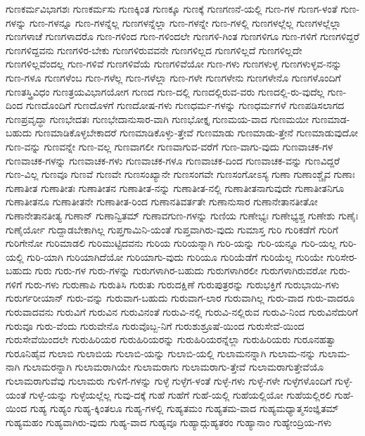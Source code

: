 {ಗುಣಕರ್ಮವಿಭಾಗಶಃ
ಗುಣಕರ್ಮಸು
ಗುಣಕ್ಕಿಂತ
ಗುಣಕ್ಕೂ
ಗುಣಕ್ಕೆ
ಗುಣಗಣನೆ-ಯಲ್ಲಿ
ಗುಣ-ಗಳ
ಗುಣಗ-ಳಂತೆ
ಗುಣ-ಗಳನ್ನು
ಗುಣ-ಗಳನ್ನೂ
ಗುಣ-ಗಳನ್ನೆಲ್ಲ
ಗುಣಗಳನ್ನೆಲ್ಲಾ
ಗುಣ-ಗಳನ್ನೇ
ಗುಣ-ಗಳಲ್ಲಿ
ಗುಣಗಳಲ್ಲೆಲ್ಲ
ಗುಣಗಳಲ್ಲೆಲ್ಲಾ
ಗುಣಗಳಾಚೆ
ಗುಣಗಳಾದರೊ
ಗುಣ-ಗಳಿಂದ
ಗುಣ-ಗಳಿಂದಲೇ
ಗುಣಗಳಿ-ಗಿಂತ
ಗುಣಗಳಿಗೂ
ಗುಣ-ಗಳಿಗೆ
ಗುಣಗಳಿದ್ದರೆ
ಗುಣಗಳಿದ್ದವನು
ಗುಣಗಳಿರ-ಬೇಕು
ಗುಣಗಳಿರುವವನೇ
ಗುಣಗಳಿಲ್ಲದ
ಗುಣಗಳಿಲ್ಲದೆ
ಗುಣಗಳಿಲ್ಲದೇ
ಗುಣಗಳಿಲ್ಲವೆಂದಲ್ಲ
ಗುಣ-ಗಳಿವೆ
ಗುಣಗಳಿವೆಯೆ
ಗುಣಗಳಿವೆಯೋ
ಗುಣ-ಗಳು
ಗುಣಗಳುಳ್ಳ
ಗುಣಗಳುಳ್ಳವ-ನನ್ನು
ಗುಣ-ಗಳೂ
ಗುಣಗಳೆಂಬ
ಗುಣ-ಗಳೆಲ್ಲ
ಗುಣ-ಗಳೆಲ್ಲಾ
ಗುಣ-ಗಳೇ
ಗುಣಗಳೇನು
ಗುಣಗಳೇನೊ
ಗುಣಗಳೊಂದಿಗೆ
ಗುಣತಸ್ತ್ರಿವಿಧಂ
ಗುಣತ್ರಯವಿಭಾಗಯೋಗ
ಗುಣದ
ಗುಣ-ದಲ್ಲಿ
ಗುಣದಲ್ಲಿರುವ-ವರು
ಗುಣದಲ್ಲಿ-ರು-ವುದೆಲ್ಲ
ಗುಣ-ದಿಂದ
ಗುಣದೊಂದಿಗೆ
ಗುಣದೊಳಗೆ
ಗುಣದೋಷ-ಗಳು
ಗುಣಧರ್ಮ-ಗಳನ್ನು
ಗುಣಧರ್ಮಗಳೆ
ಗುಣಪಡಿಸಲಾಗದ
ಗುಣಪ್ರವೃದ್ಧಾ
ಗುಣಭೇದತಃ
ಗುಣಭೇದಾನುಸಾರ-ವಾಗಿ
ಗುಣಭೋಕ್ತೃ
ಗುಣಮಯ-ವಾದ
ಗುಣಮಯೀ
ಗುಣಮಾಡ-ಬಹುದು
ಗುಣಮಾಡಿಕೊಳ್ಳಬೇಕಾದರೆ
ಗುಣಮಾಡಿಕೊಳ್ಳು-ತ್ತೇವೆ
ಗುಣಮಾಡು
ಗುಣಮಾಡು-ತ್ತೇನೆ
ಗುಣಮಾಡುವುದೋ
ಗುಣ-ವನ್ನು
ಗುಣವನ್ನೇ
ಗುಣ-ವಲ್ಲ
ಗುಣವಾಗಲೀ
ಗುಣವಾಗುವ-ವರೆಗೆ
ಗುಣ-ವಾಗು-ವುದು
ಗುಣವಾಚಕ-ಗಳ
ಗುಣವಾಚಕ-ಗಳನ್ನು
ಗುಣವಾಚಕ-ಗಳು
ಗುಣವಾಚಕ-ಗಳೂ
ಗುಣವಾಚಕ-ದಿಂದ
ಗುಣವಾಚಕ-ವನ್ನು
ಗುಣವಿದ್ದರೆ
ಗುಣ-ವಿಲ್ಲ
ಗುಣವೂ
ಗುಣವೆ
ಗುಣವೇ
ಗುಣಸಂಖ್ಯಾನೇ
ಗುಣಸಂಗವೇ
ಗುಣಸಂಗೋಽಸ್ಯ
ಗುಣಾ
ಗುಣಾಂಶ್ಚೈವ
ಗುಣಾಃ
ಗುಣಾತೀತ
ಗುಣಾತೀತಃ
ಗುಣಾತೀತನ
ಗುಣಾತೀತ-ನನ್ನು
ಗುಣಾತೀತ-ನಲ್ಲಿ
ಗುಣಾತೀತನಾಗುವುದೇ
ಗುಣಾತೀತನಿಗೂ
ಗುಣಾತೀತನೂ
ಗುಣಾತೀತನೇ
ಗುಣಾತೀತ-ರಿಂದ
ಗುಣಾನತಿವರ್ತತೇ
ಗುಣಾನುಸಾರ
ಗುಣಾನೇತಾನತೀತೋ
ಗುಣಾನೇತಾನತೀತ್ಯ
ಗುಣಾನ್
ಗುಣಾನ್ವಿತಮ್
ಗುಣಾವಗುಣ-ಗಳನ್ನು
ಗುಣಿಯ
ಗುಣೇಭ್ಯಃ
ಗುಣೇಭ್ಯಶ್ಚ
ಗುಣೇಶು
ಗುಣೈಃ
ಗುಣೈರ್ಯೋ
ಗುದ್ದಾಡಬೇಕಾಗಿಲ್ಲ
ಗುಪ್ತಗಾಮಿನಿ-ಯಂತೆ
ಗುಪ್ತವಾಗಿರು-ವುದು
ಗುಮಾಸ್ತ
ಗುರಿ
ಗುರಿಕಡೆಗೆ
ಗುರಿಗೆ
ಗುರಿಗೇನೋ
ಗುರಿಮಾಡಲಿ
ಗುರಿಮುಟ್ಟಿದವನು
ಗುರಿಯ
ಗುರಿಯನ್ನಾಗಿ
ಗುರಿ-ಯನ್ನು
ಗುರಿ-ಯನ್ನೂ
ಗುರಿ-ಯಲ್ಲ
ಗುರಿ-ಯಲ್ಲಿ
ಗುರಿ-ಯಾಗಿ
ಗುರಿಯಾಗಿದೆಯೋ
ಗುರಿಯಾಗು-ವುದು
ಗುರಿಯೂ
ಗುರಿಯೆಡೆಗೆ
ಗುರಿಯೆಲ್ಲ
ಗುರಿಯೇ
ಗುರಿಸೇರ-ಬಹುದು
ಗುರು
ಗುರು-ಗಳ
ಗುರು-ಗಳನ್ನು
ಗುರುಗಳಾಗಿರ-ಬಹುದು
ಗುರುಗಳಾಗಿರಲೀ
ಗುರುಗಳಾಗಿರುವರೋ
ಗುರು-ಗಳಿಗೆ
ಗುರು-ಗಳು
ಗುರುಣಾಪಿ
ಗುರುತಿಸಿ
ಗುರುತು
ಗುರುದಕ್ಷಿಣೆ
ಗುರುಪುತ್ರರನ್ನು
ಗುರುಭಕ್ತಿಗೆ
ಗುರುಭಾಯಿ-ಗಳು
ಗುರುರ್ಗರೀಯಾನ್
ಗುರು-ವನ್ನು
ಗುರುವಾಗ-ಬಹುದು
ಗುರುವಾಗ-ಲಾರ
ಗುರುವಾಗಿಲ್ಲ
ಗುರು-ವಾದ
ಗುರು-ವಾದರೂ
ಗುರುವಾದವನು
ಗುರುವಿಗೆ
ಗುರುವಿನ
ಗುರುವಿನಂತೆ
ಗುರುವಿ-ನಲ್ಲಿ
ಗುರುವಿ-ನಲ್ಲಿರುವ
ಗುರುವಿ-ನಿಂದ
ಗುರುವಿನೆದುರಿಗೆ
ಗುರುವೂ
ಗುರು-ವೆಂದು
ಗುರುವೇನೊ
ಗುರುವೊಬ್ಬ-ನಿಗೆ
ಗುರುಶುಶ್ರೂಷೆ-ಯಿಂದ
ಗುರುಸೇವೆ-ಯಿಂದ
ಗುರುಸೇವೆಯಿಂದಲೇ
ಗುರುಹಿರಿಯರ
ಗುರುಹಿರಿಯರನ್ನು
ಗುರುಹಿರಿಯರನ್ನೆಲ್ಲಾ
ಗುರುಹಿರಿಯರು
ಗುರೂನಹತ್ವಾ
ಗುರೂನಿಹೈವ
ಗುಲಾಬಿ
ಗುಲಾಬಿಯ
ಗುಲಾಬಿ-ಯನ್ನು
ಗುಲಾಬಿ-ಯಲ್ಲಿ
ಗುಲಾಮನನ್ನಾಗಿ
ಗುಲಾಮ-ನನ್ನು
ಗುಲಾಮ-ನಾಗಿ
ಗುಲಾಮರನ್ನಾಗಿ
ಗುಲಾಮರಾಗಿಯೇ
ಗುಲಾಮರಾಗು
ಗುಲಾಮರಾಗು-ತ್ತೇವೆ
ಗುಲಾಮರಾಗುತ್ತೇವೆಯೊ
ಗುಲಾಮರಾಗುವೆವು
ಗುಲಾಮರು
ಗುಳಿಗೆ-ಗಳನ್ನು
ಗುಳ್ಳೆ
ಗುಳ್ಳೆಗ-ಳಂತೆ
ಗುಳ್ಳೆ-ಗಳು
ಗುಳ್ಳೆ-ಗಳೇ
ಗುಳ್ಳೆಗಳೊಂದಿಗೆ
ಗುಳ್ಳೆ-ಯಂತೆ
ಗುಳ್ಳೆ-ಯನ್ನು
ಗುಳ್ಳೆಯಲ್ಲೆಲ್ಲ
ಗುವು-ದಕ್ಕೆ
ಗುಹೆ
ಗುಹೆಗೆ
ಗುಹೆ-ಯಲ್ಲಿ
ಗುಹೆಯಲ್ಲಿಯೋ
ಗುಹೆಯಲ್ಲಿರಲಿ
ಗುಹೆ-ಯಿಂದ
ಗುಹ್ಯ
ಗುಹ್ಯಂ
ಗುಹ್ಯ-ಕ್ಕಿಂತಲೂ
ಗುಹ್ಯ-ಗಳಲ್ಲಿ
ಗುಹ್ಯತಮಂ
ಗುಹ್ಯತಮ-ವಾದ
ಗುಹ್ಯಮಧ್ಯಾತ್ಮಸಂಜ್ಞಿತಮ್
ಗುಹ್ಯಮಹಂ
ಗುಹ್ಯವಾಗಿರು-ವುದು
ಗುಹ್ಯ-ವಾದ
ಗುಹ್ಯವೂ
ಗುಹ್ಯಾದ್ಗುಹ್ಯತರಂ
ಗುಹ್ಯಾನಾಂ
ಗುಹ್ಯೇಂದ್ರಿಯ-ಗಳು
}
